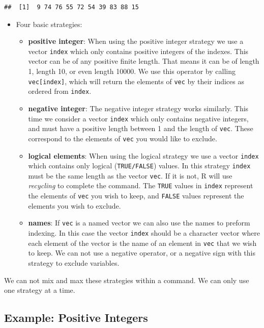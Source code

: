 \documentclass[
]{book}
\providecommand{\tightlist}{%
  \setlength{\itemsep}{0pt}\setlength{\parskip}{0pt}}
\begin{document}
\begin{verbatim}
##  [1]  9 74 76 55 72 54 39 83 88 15
\end{verbatim}

\begin{itemize}
\tightlist
\item
  Four basic strategies:

  \begin{itemize}
  \tightlist
  \item
    \textbf{positive integer}: When using the positive integer strategy we use a vector \texttt{index} which only contains positive integers of the indexes. This vector can be of any positive finite length. That means it can be of length 1, length 10, or even length 10000. We use this operator by calling \texttt{vec{[}index{]}}, which will return the elements of \texttt{vec} by their indices as ordered from \texttt{index}.
  \item
    \textbf{negative integer}: The negative integer strategy works similarly. This time we consider a vector \texttt{index} which only contains negative integers, and must have a positive length between 1 and the length of \texttt{vec}. These correspond to the elements of \texttt{vec} you would like to exclude.\\
  \item
    \textbf{logical elements}: When using the logical strategy we use a vector \texttt{index} which contains only logical (\texttt{TRUE/FALSE}) values. In this strategy \texttt{index} must be the same length as the vector \texttt{vec}. If it is not, R will use \emph{recycling} to complete the command. The \texttt{TRUE} values in \texttt{index} represent the elements of \texttt{vec} you wish to keep, and \texttt{FALSE} values represent the elements you wish to exclude.
  \item
    \textbf{names}: If \texttt{vec} is a named vector we can also use the names to preform indexing. In this case the vector \texttt{index} should be a character vector where each element of the vector is the name of an element in \texttt{vec} that we wish to keep. We can not use a negative operator, or a negative sign with this strategy to exclude variables.
  \end{itemize}
\end{itemize}

We can not mix and max these strategies within a command. We can only use one strategy at a time.

\hypertarget{example-positive-integers}{%
\subsection*{Example: Positive Integers}\label{example-positive-integers}}
\end{document}
